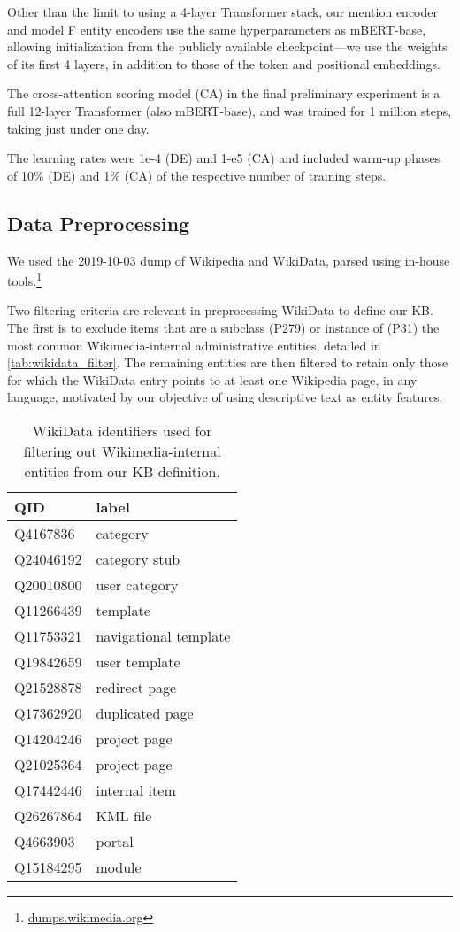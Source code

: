 \documentclass[11pt,a4paper]{article}
\begin{document}
Other than the limit to using a 4-layer Transformer stack, our mention encoder and model F entity encoders use the same hyperparameters as mBERT-base, allowing initialization from the publicly available checkpoint---we use the weights of its first 4 layers, in addition to those of the token and positional embeddings.

The cross-attention scoring model (CA) in the final preliminary experiment is a full 12-layer Transformer (also mBERT-base), and was trained for 1 million steps, taking just under one day.

The learning rates were 1e-4 (DE) and 1-e5 (CA) and included warm-up phases of 10\% (DE) and 1\% (CA) of the respective number of training steps.

\subsection{Data Preprocessing}\label{appsec:dataprep}
We used the 2019-10-03 dump of Wikipedia and WikiData, parsed using in-house tools.\footnote{\url{dumps.wikimedia.org}}

Two filtering criteria are relevant in preprocessing WikiData to define our KB. 
The first is to exclude items that are a subclass (P279) or instance of (P31) the most common Wikimedia-internal administrative entities, detailed in \autoref{tab:wikidata_filter}.
The remaining entities are then filtered to retain only those for which the WikiData entry points to at least one Wikipedia page, in any language, motivated by our objective of using descriptive text as entity features.

\begin{table}
\centering
\begin{tabular}{l l} \toprule
{\bf QID} & {\bf label} \\ \midrule
Q4167836  &  category \\
Q24046192 &  category stub \\
Q20010800 &  user category \\
Q11266439 &  template \\
Q11753321 &  navigational template \\
Q19842659 &  user template \\
Q21528878 &  redirect page \\
Q17362920 &  duplicated page \\
Q14204246 &  project page \\
Q21025364 &  project page \\
Q17442446 &  internal item \\
Q26267864 &  KML file \\
Q4663903  &  portal \\
Q15184295 &  module \\ \bottomrule
\end{tabular}
\caption{WikiData identifiers used for filtering out Wikimedia-internal entities from our KB definition.
\label{tab:wikidata_filter}}
\end{table}
\end{document}
